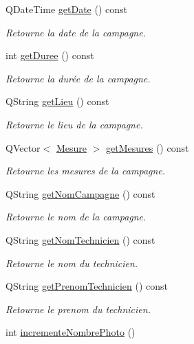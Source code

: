 \begin{DoxyCompactItemize}
Q\+Date\+Time \hyperlink{class_campagne_a319b5bb4ed2b0fc1a10fc4d099a7a6d2}{get\+Date} () const
\begin{DoxyCompactList}\small\item\em Retourne la date de la campagne. \end{DoxyCompactList}\item 
int \hyperlink{class_campagne_abe02a9050f4a5ea9521dd40b855c350b}{get\+Duree} () const
\begin{DoxyCompactList}\small\item\em Retourne la durée de la campagne. \end{DoxyCompactList}\item 
Q\+String \hyperlink{class_campagne_a98d71a731d16dec7a882787387b29d8e}{get\+Lieu} () const
\begin{DoxyCompactList}\small\item\em Retourne le lieu de la campagne. \end{DoxyCompactList}\item 
Q\+Vector$<$ \hyperlink{struct_mesure}{Mesure} $>$ \hyperlink{class_campagne_ab3a3e6e325fec3aef0521f077e71c914}{get\+Mesures} () const
\begin{DoxyCompactList}\small\item\em Retourne les mesures de la campagne. \end{DoxyCompactList}\item 
Q\+String \hyperlink{class_campagne_a99a682fcb8e5a3f8c2aff7a44eb2c930}{get\+Nom\+Campagne} () const
\begin{DoxyCompactList}\small\item\em Retourne le nom de la campagne. \end{DoxyCompactList}\item 
Q\+String \hyperlink{class_campagne_ae1df1bd6234222ccdaf5a1d20d64ee46}{get\+Nom\+Technicien} () const
\begin{DoxyCompactList}\small\item\em Retourne le nom du technicien. \end{DoxyCompactList}\item 
Q\+String \hyperlink{class_campagne_ac6c7772ef5d7b15964664d659b486263}{get\+Prenom\+Technicien} () const
\begin{DoxyCompactList}\small\item\em Retourne le prenom du technicien. \end{DoxyCompactList}\item 
int \hyperlink{class_campagne_ab6a893a28bc18e054d2d19d2671ce6da}{incremente\+Nombre\+Photo} ()

\end{DoxyCompactItemize}
